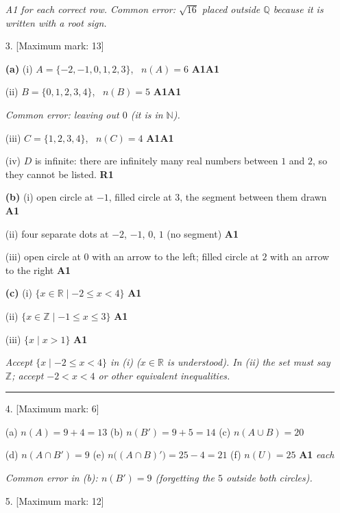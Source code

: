 \documentclass[12pt, twoside]{article}
\begin{document}
\begin{enumerate}[itemsep=0.3cm]
\emph{A1 for each correct row. Common error: $\sqrt{16}$ placed outside
$\mathbb{Q}$ because it is written with a root sign.}

\newpage

\item[3.] [Maximum mark: 13]

\textbf{(a)} (i) $A = \{-2, -1, 0, 1, 2, 3\}$, \ $n(A) = 6$ \hfill \textbf{A1A1}

(ii) $B = \{0, 1, 2, 3, 4\}$, \ $n(B) = 5$ \hfill \textbf{A1A1}

\emph{Common error: leaving out $0$ (it is in $\mathbb{N}$).}

(iii) $C = \{1, 2, 3, 4\}$, \ $n(C) = 4$ \hfill \textbf{A1A1}

(iv) $D$ is infinite: there are infinitely many real numbers between $1$
and $2$, so they cannot be listed. \hfill \textbf{R1}

\textbf{(b)} (i) open circle at $-1$, filled circle at $3$, the segment
between them drawn \hfill \textbf{A1}

(ii) four separate dots at $-2$, $-1$, $0$, $1$ (no segment) \hfill \textbf{A1}

(iii) open circle at $0$ with an arrow to the left; filled circle at $2$
with an arrow to the right \hfill \textbf{A1}

\textbf{(c)} (i) $\{x \in \mathbb{R} \mid -2 \le x < 4\}$ \hfill \textbf{A1}

(ii) $\{x \in \mathbb{Z} \mid -1 \le x \le 3\}$ \hfill \textbf{A1}

(iii) $\{x \mid x > 1\}$ \hfill \textbf{A1}

\emph{Accept $\{x \mid -2 \le x < 4\}$ in (i) ($x \in \mathbb{R}$ is
understood). In (ii) the set must say $\mathbb{Z}$; accept
$-2 < x < 4$ or other equivalent inequalities.}

\bigskip \hrule \bigskip

\item[4.] [Maximum mark: 6]

(a) $n(A) = 9 + 4 = 13$ \qquad (b) $n(B') = 9 + 5 = 14$ \qquad
(c) $n(A \cup B) = 20$

(d) $n(A \cap B') = 9$ \qquad (e) $n\big((A \cap B)'\big) = 25 - 4 = 21$
\qquad (f) $n(U) = 25$ \hfill \textbf{A1} \emph{each}

\emph{Common error in (b): $n(B') = 9$ (forgetting the $5$ outside both
circles).}

\newpage

\item[5.] [Maximum mark: 12]


\end{enumerate}
\end{document}
